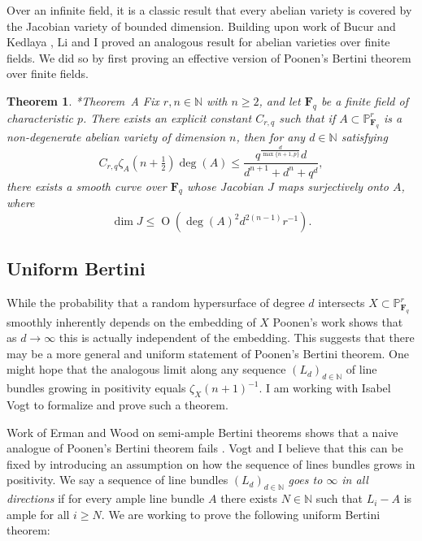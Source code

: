 \documentclass[11pt,reqno]{amsart}
\newtheorem{theorem}[lemma]{Theorem}
\theoremstyle{remark}
\newcommand{\fF}{\mathbf F}
\newcommand{\OO}{\operatorname{O}}
\newcommand{\N}{\mathbb{N}}
\renewcommand{\P}{\mathbb{P}}
\begin{document}
Over an infinite field, it is a classic result that every abelian variety is covered by the Jacobian variety of bounded dimension. Building upon work of Bucur and Kedlaya \cite{bucurKedlaya12}, Li and I proved an analogous result for abelian varieties over finite fields. We did so by first proving an effective version of Poonen's Bertini theorem over finite fields. 
\begin{theorem}\cite{bruceLi19}*{Theorem~A}
Fix $r,n\in \N$ with $n\geq2$, and let $\fF_{q}$ be a finite field of characteristic $p$. There exists an explicit constant $C_{r,q}$ such that if $A\subset \P^{r}_{\fF_q}$ is a non-degenerate abelian variety of dimension $n$, then for any $d\in \N$ satisfying 
\[
C_{r,q}\zeta_{A}\left(n+\tfrac{1}{2}\right) \deg(A) \leq  \frac{q^{\frac{d}{\max\{n+1,p\}}}d}{d^{n+1}+d^n+q^{d}},
\]
there exists a smooth curve over $\fF_{q}$ whose Jacobian $J$ maps surjectively onto $A$, where 
\[
\dim J\leq 
\OO\left( \deg(A)^2 d^{2(n-1)}r^{-1}\right).
\]
\end{theorem} 

\subsection{Uniform Bertini}

While the probability that a random hypersurface of degree $d$ intersects $X\subset \P^r_{\fF_{q}}$ smoothly inherently depends on the embedding of $X$ Poonen's work shows that as $d\to\infty$ this is actually independent of the embedding. 
This suggests that there may be a more general and uniform statement of Poonen's Bertini theorem. One might hope that the analogous limit along any sequence $(L_{d})_{d\in\N}$ of line bundles growing in positivity equals $\zeta_{X}(n+1)^{-1}$. I am working with Isabel Vogt to formalize and prove such a theorem.

Work of Erman and Wood on semi-ample Bertini theorems shows that a naive analogue of Poonen's Bertini theorem fails \cite{ermanWood15}. Vogt and I believe that this can be fixed by introducing an assumption on how the sequence of lines bundles grows in positivity. We say a sequence of line bundles  $\left(L_{d}\right)_{d\in\N}$ \textit{goes to $\infty$ in all directions} if for every ample line bundle $A$ there exists $N\in \N$ such that $L_{i}-A$ is ample for all $i\geq N$. We are working to prove the following uniform Bertini theorem:
 
\end{document}
